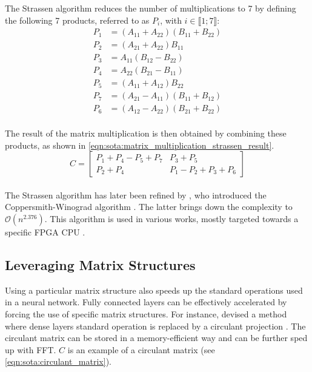 \noindent The Strassen algorithm reduces the number of multiplications to 7 by
defining the following 7 products, referred to as $P_{i}$, with $i\in \llbracket
1;7 \rrbracket$:\\

\begin{equation}
  \label{eqn:sota:matrix_multiplication_strassen}
  \begin{aligned}
    P_{1} & = (A_{11} + A_{22})(B_{11} + B_{22}) \\
    P_{2} & = (A_{21} + A_{22})B_{11}            \\
    P_{3} & = A_{11}(B_{12} - B_{22})            \\
    P_{4} & = A_{22}(B_{21} - B_{11})            \\
    P_{5} & = (A_{11} + A_{12})B_{22}            \\
    P_{7} & = (A_{21} - A_{11})(B_{11} + B_{12}) \\
    P_{6} & = (A_{12} - A_{22})(B_{21} + B_{22})
  \end{aligned}
\end{equation}\\

\noindent The result of the matrix multiplication is then obtained by combining
these products, as shown in
\cref{eqn:sota:matrix_multiplication_strassen_result}.\\

\begin{equation}
  \label{eqn:sota:matrix_multiplication_strassen_result}
  C = \begin{bmatrix}
    P_{1} + P_{4} - P_{5} + P_{7} & P_{3} + P_{5}                 \\
    P_{2} + P_{4}                 & P_{1} - P_{2} + P_{3} + P_{6}
  \end{bmatrix}
\end{equation}\\

\noindent The Strassen algorithm has later been refined by
\citeauthor{coppersmith1987matrix}, who introduced the Coppersmith-Winograd
algorithm \cite{coppersmith1987matrix}. The latter brings down the complexity to
$\mathcal{O}(n^{2.376})$. This algorithm is used in various works, mostly
targeted towards a specific \ac{FPGA} \ac{CPU}
\cite{liu2018efficient,lu2018spwa,wang2020winonn}.\\

\subsection{Leveraging Matrix Structures}\label{sec:sota:matrix_structures}
Using a particular matrix structure also speeds up the standard operations used
in a neural network. Fully connected layers can be effectively accelerated by
forcing the use of specific matrix structures. For instance,
\citeauthor{DBLP:conf/iccv/ChengYFKCC15} devised a method where dense layers
standard operation is replaced by a circulant projection
\cite{DBLP:conf/iccv/ChengYFKCC15}. The circulant matrix can be stored in a
memory-efficient way and can be further sped up with \ac{FFT}. $C$ is an example
of a circulant matrix (see \cref{eqn:sota:circulant_matrix}).\\

